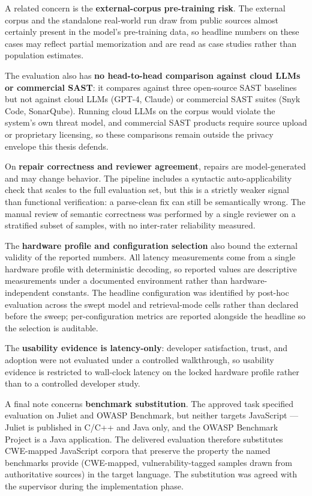 A related concern is the \textbf{external-corpus pre-training risk}. The external corpus and the standalone real-world run draw from public sources almost certainly present in the model's pre-training data, so headline numbers on these cases may reflect partial memorization and are read as case studies rather than population estimates.

The evaluation also has \textbf{no head-to-head comparison against cloud LLMs or commercial SAST}: it compares against three open-source SAST baselines but not against cloud LLMs (GPT-4, Claude) or commercial SAST suites (Snyk Code, SonarQube). Running cloud LLMs on the corpus would violate the system's own threat model, and commercial SAST products require source upload or proprietary licensing, so these comparisons remain outside the privacy envelope this thesis defends.

On \textbf{repair correctness and reviewer agreement}, repairs are model-generated and may change behavior. The pipeline includes a syntactic auto-applicability check that scales to the full evaluation set, but this is a strictly weaker signal than functional verification: a parse-clean fix can still be semantically wrong. The manual review of semantic correctness was performed by a single reviewer on a stratified subset of samples, with no inter-rater reliability measured.

The \textbf{hardware profile and configuration selection} also bound the external validity of the reported numbers. All latency measurements come from a single hardware profile with deterministic decoding, so reported values are descriptive measurements under a documented environment rather than hardware-independent constants. The headline configuration was identified by post-hoc evaluation across the swept model and retrieval-mode cells rather than declared before the sweep; per-configuration metrics are reported alongside the headline so the selection is auditable.

The \textbf{usability evidence is latency-only}: developer satisfaction, trust, and adoption were not evaluated under a controlled walkthrough, so usability evidence is restricted to wall-clock latency on the locked hardware profile rather than to a controlled developer study.

A final note concerns \textbf{benchmark substitution}. The approved task specified evaluation on Juliet and OWASP Benchmark, but neither targets JavaScript --- Juliet is published in C/C++ and Java only, and the OWASP Benchmark Project is a Java application. The delivered evaluation therefore substitutes CWE-mapped JavaScript corpora that preserve the property the named benchmarks provide (CWE-mapped, vulnerability-tagged samples drawn from authoritative sources) in the target language. The substitution was agreed with the supervisor during the implementation phase.
